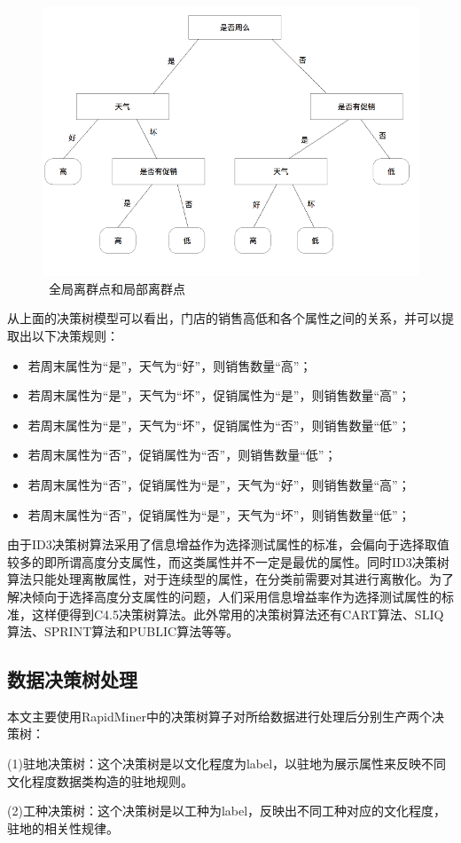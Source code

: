 \begin{figure}[thbp!]
	\centering
	\includegraphics[width=0.4\linewidth]{figure/3-1}
	\caption{\ 全局离群点和局部离群点}
	\label{fig:3-1}
\end{figure}

从上面的决策树模型可以看出，门店的销售高低和各个属性之间的关系，并可以提取出以下决策规则：

\begin{itemize}
	\item 若周末属性为“是”，天气为“好”，则销售数量“高”；
	\item 若周末属性为“是”，天气为“坏”，促销属性为“是”，则销售数量“高”；
	\item 若周末属性为“是”，天气为“坏”，促销属性为“否”，则销售数量“低”；
	\item 若周末属性为“否”，促销属性为“否”，则销售数量“低”；
	\item 若周末属性为“否”，促销属性为“是”，天气为“好”，则销售数量“高”；
	\item 若周末属性为“否”，促销属性为“是”，天气为“坏”，则销售数量“低”；
\end{itemize}

由于ID3决策树算法采用了信息增益作为选择测试属性的标准，会偏向于选择取值较多的即所谓高度分支属性，而这类属性并不一定是最优的属性。同时ID3决策树算法只能处理离散属性，对于连续型的属性，在分类前需要对其进行离散化。为了解决倾向于选择高度分支属性的问题，人们采用信息增益率作为选择测试属性的标准，这样便得到C4.5决策树算法。此外常用的决策树算法还有CART算法、SLIQ算法、SPRINT算法和PUBLIC算法等等。

\subsection{数据决策树处理}

本文主要使用RapidMiner中的决策树算子对所给数据进行处理后分别生产两个决策树：

(1)驻地决策树：这个决策树是以文化程度为label，以驻地为展示属性来反映不同文化程度数据类构造的驻地规则。

(2)工种决策树：这个决策树是以工种为label，反映出不同工种对应的文化程度，驻地的相关性规律。
